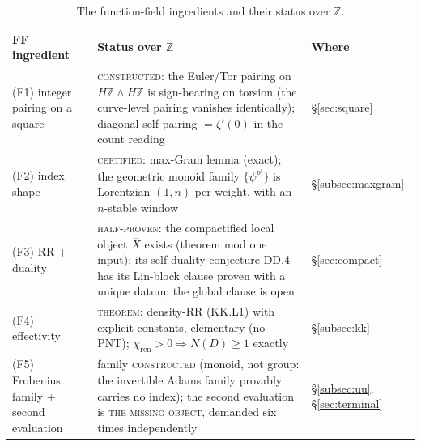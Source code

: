 \documentclass[11pt,reqno]{amsart}
\theoremstyle{plain}
\theoremstyle{definition}
\theoremstyle{remark}
\newcommand{\Z}{\mathbb{Z}}
\newcommand{\HZ}{H\Z}
\newcommand{\Xbar}{\overline{X}}
\begin{document}
\begin{table}[ht]
\caption{The function-field ingredients and their status over $\Z$.}\label{tab:ff-status}
\small
\begin{tabular}{p{} p{} p{}}
\toprule
\textbf{FF ingredient} & \textbf{Status over $\Z$} & \textbf{Where} \\
\midrule
(F1) integer pairing on a square & \textsc{constructed}: the Euler/Tor pairing on
$\HZ \wedge \HZ$ is sign-bearing on torsion (the curve-level pairing vanishes identically);
diagonal self-pairing $= \zeta'(0)$ in the count reading & \S\ref{sec:square} \\[3pt]
(F2) index shape & \textsc{certified}: max-Gram lemma (exact); the geometric monoid family
$\{\psi^{p^i}\}$ is Lorentzian $(1,n)$ per weight, with an $n$-stable window &
\S\ref{subsec:maxgram} \\[3pt]
(F3) RR + duality & \textsc{half-proven}: the compactified local object $\Xbar$ exists
(theorem mod one input); its self-duality conjecture DD.4 has its Lin-block clause proven
with a unique datum; the global clause is open & \S\ref{sec:compact} \\[3pt]
(F4) effectivity & \textsc{theorem}: density-RR (KK.L1) with explicit constants, elementary
(no PNT); $\chi_{\mathrm{ren}} > 0 \Rightarrow N(D) \ge 1$ exactly & \S\ref{subsec:kk} \\[3pt]
(F5) Frobenius family + second evaluation & family \textsc{constructed} (monoid, not group:
the invertible Adams family provably carries no index); the second evaluation is \textsc{the
missing object}, demanded six times independently & \S\ref{subsec:uu},
\S\ref{sec:terminal} \\
\bottomrule
\end{tabular}
\end{table}
\end{document}
